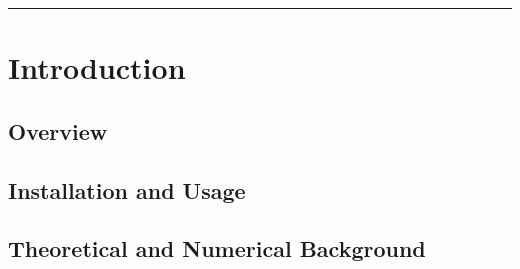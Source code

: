 \documentclass[tocAsPDFpart]{fipy}
\begin{document}
\doparttoc

\frontmatter

\title{\FiPy{}}
\subtitle{A Finite Volume PDE Solver Using Python}

\author{Daniel Wheeler \and Jonathan E. Guyer \and James A. Warren}

\maketitle

\vspace*{\fill}



\rule{\textwidth}{0.1pt}



\tableofcontents

\mainmatter


\part{Introduction}


\renewcommand{\ptctitle}{Introduction Contents}

\parttoc


\chapter{Overview}


  


\chapter{Installation and Usage}
\label{chap:Installation}





\chapter{Theoretical and Numerical Background}
\label{chap:Numerics}
\end{document}
